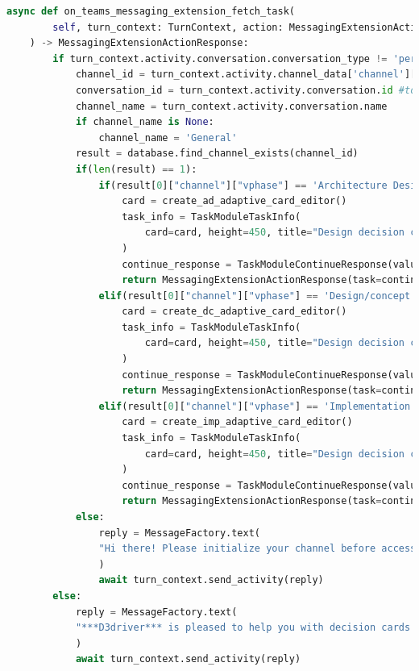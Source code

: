 \begin{lstlisting}[caption={messaging\_extension\_action\_preview\_bot.py},label={lst:fetchtask},language=python]
 async def on_teams_messaging_extension_fetch_task(
        self, turn_context: TurnContext, action: MessagingExtensionAction
    ) -> MessagingExtensionActionResponse:
        if turn_context.activity.conversation.conversation_type != 'personal':
            channel_id = turn_context.activity.channel_data['channel']['id']
            conversation_id = turn_context.activity.conversation.id #to distinguish 'Generals' of different teams
            channel_name = turn_context.activity.conversation.name
            if channel_name is None:
                channel_name = 'General'
            result = database.find_channel_exists(channel_id)
            if(len(result) == 1):
                if(result[0]["channel"]["vphase"] == 'Architecture Design'):
                    card = create_ad_adaptive_card_editor()
                    task_info = TaskModuleTaskInfo(
                        card=card, height=450, title="Design decision card", width=500
                    )
                    continue_response = TaskModuleContinueResponse(value=task_info)
                    return MessagingExtensionActionResponse(task=continue_response)
                elif(result[0]["channel"]["vphase"] == 'Design/concept'):
                    card = create_dc_adaptive_card_editor()
                    task_info = TaskModuleTaskInfo(
                        card=card, height=450, title="Design decision card", width=500
                    )
                    continue_response = TaskModuleContinueResponse(value=task_info)
                    return MessagingExtensionActionResponse(task=continue_response)
                elif(result[0]["channel"]["vphase"] == 'Implementation'):
                    card = create_imp_adaptive_card_editor()
                    task_info = TaskModuleTaskInfo(
                        card=card, height=450, title="Design decision card", width=500
                    )
                    continue_response = TaskModuleContinueResponse(value=task_info)
                    return MessagingExtensionActionResponse(task=continue_response)
            else: 
                reply = MessageFactory.text(
                "Hi there! Please initialize your channel before accessing the cards by using the init command." 
                )
                await turn_context.send_activity(reply)
        else:
            reply = MessageFactory.text(
            "***D3driver*** is pleased to help you with decision cards in your required channels. Please access the bot using the default commands in any channel. ***Happy Documenting!***"
            )
            await turn_context.send_activity(reply)
\end{lstlisting}


